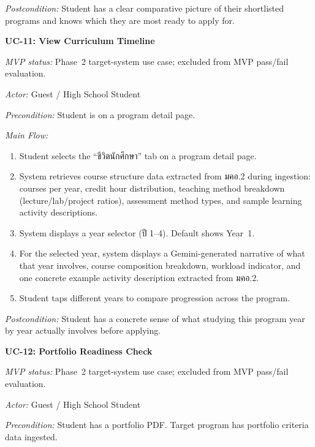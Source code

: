 \noindent\textit{Postcondition:} Student has a clear comparative picture of their shortlisted programs and knows which they are most ready to apply for.

\vspace{1ex}
\noindent\textbf{UC-11: View Curriculum Timeline}

\noindent\textit{MVP status:} Phase~2 target-system use case; excluded from MVP pass/fail evaluation.

\noindent\textit{Actor:} Guest / High School Student

\noindent\textit{Precondition:} Student is on a program detail page.

\noindent\textit{Main Flow:}
\begin{enumerate}[leftmargin=80pt]
    \item Student selects the ``ชีวิตนักศึกษา'' tab on a program detail page.
    \item System retrieves course structure data extracted from มคอ.2 during ingestion: courses per year, credit hour distribution, teaching method breakdown (lecture/lab/project ratios), assessment method types, and sample learning activity descriptions.
    \item System displays a year selector (ปี 1--4). Default shows Year~1.
    \item For the selected year, system displays a Gemini-generated narrative of what that year involves, course composition breakdown, workload indicator, and one concrete example activity description extracted from มคอ.2.
    \item Student taps different years to compare progression across the program.
\end{enumerate}

\noindent\textit{Postcondition:} Student has a concrete sense of what studying this program year by year actually involves before applying.

\vspace{1ex}
\noindent\textbf{UC-12: Portfolio Readiness Check}

\noindent\textit{MVP status:} Phase~2 target-system use case; excluded from MVP pass/fail evaluation.

\noindent\textit{Actor:} Guest / High School Student

\noindent\textit{Precondition:} Student has a portfolio PDF. Target program has portfolio criteria data ingested.

